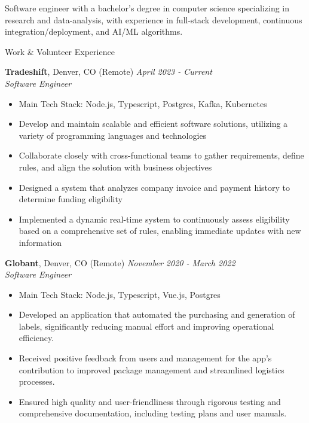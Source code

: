 \documentclass{res} %
\begin{document}
\begin{summary}{}
  Software engineer with a bachelor's degree in computer science specializing in research and data-analysis, with experience in full-stack development, continuous integration/deployment, and AI/ML algorithms.
\end{summary}


\begin{rSection}{Work \& Volunteer Experience}

  {\bf Tradeshift}, Denver, CO (Remote) \hfill {\em April 2023 - Current}
  \\ {\em Software Engineer}
  \begin{itemize}[leftmargin=*, topsep=-3pt] \itemsep -5pt
    \item[] Main Tech Stack: Node.js, Typescript, Postgres, Kafka, Kubernetes
    \item Develop and maintain scalable and efficient software solutions, utilizing a variety of programming languages and technologies
    \item Collaborate closely with cross-functional teams to gather requirements, define rules, and align the solution with business objectives
    \item Designed a system that analyzes company invoice and payment history to determine funding eligibility
    \item Implemented a dynamic real-time system to continuously assess eligibility based on a comprehensive set of rules, enabling immediate updates with new information
  \end{itemize}

  {\bf Globant}, Denver, CO (Remote) \hfill {\em November 2020 - March 2022}
  \\ {\em Software Engineer}
  \begin{itemize}[leftmargin=*, topsep=-3pt] \itemsep -5pt
    \item[] Main Tech Stack: Node.js, Typescript, Vue.js, Postgres
    \item Developed an application that automated the purchasing and generation of labels, significantly reducing manual effort and improving operational efficiency. 
    \item Received positive feedback from users and management for the app's contribution to improved package management and streamlined logistics processes.
    \item Ensured high quality and user-friendliness through rigorous testing and comprehensive documentation, including testing plans and user manuals.
  \end{itemize}
  

\end{rSection}
\end{document}
